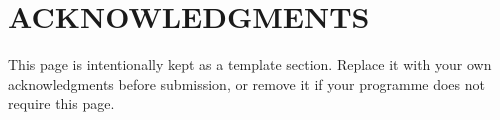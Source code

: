 \chapter*{ACKNOWLEDGMENTS}
{}

This page is intentionally kept as a template section. Replace it with your own acknowledgments before submission, or remove it if your programme does not require this page.
